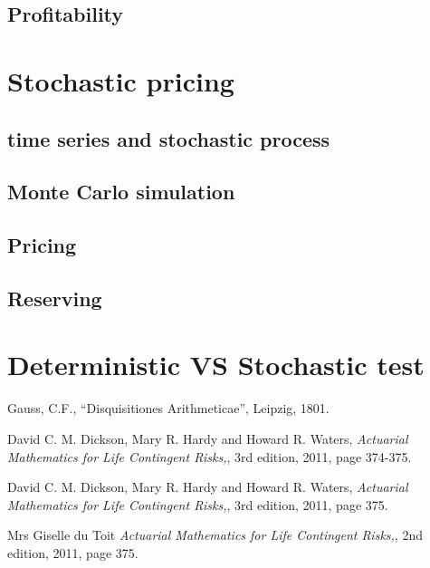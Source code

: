 \documentclass{report}
\begin{document}
\subsection{Profitability}


\section{Stochastic pricing}
\subsection{time series and stochastic process}
\subsection{Monte Carlo simulation}
\subsection{Pricing}
\subsection{Reserving}



\section{Deterministic VS Stochastic test}






\begin{thebibliography}{99}             %

 Gauss, C.F.,
    ``Disquisitiones Arithmeticae'', Leipzig, 1801.

  David C. M. Dickson, Mary R. Hardy and Howard R. Waters,
    {\em Actuarial Mathematics for Life Contingent Risks,},
    3rd edition, 2011, 
    page 374-375.

  David C. M. Dickson, Mary R. Hardy and Howard R. Waters,
    {\em Actuarial Mathematics for Life Contingent Risks,},
    3rd edition, 2011, 
    page 375.



  Mrs Giselle du Toit
    {\em Actuarial Mathematics for Life Contingent Risks,},
    2nd edition, 2011, 
    page 375.




\end{thebibliography}
\end{document}
